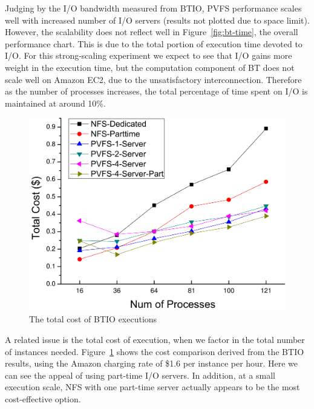     Judging by the I/O bandwidth measured from BTIO, PVFS performance scales
    well with increased number of I/O servers (results not plotted due
    to space limit). However, the scalability does not reflect well in
    Figure~\ref{fig:bt-time}, the overall performance chart. This is due to
    the total portion of execution time devoted to I/O. For this strong-scaling
    experiment we expect to see that I/O gains more weight in the execution
    time, but the computation component of BT does not scale well on Amazon
    EC2, due to the unsatisfactory interconnection. Therefore as the number of
    processes increases, the total percentage of time spent on I/O is
    maintained at around 10\%.
    \begin{figure}[htpb]
        \centering
        \includegraphics[width=0.8\linewidth]{../figures/T-cost}
        \caption{The total cost of BTIO executions}
        \label{fig:bt-cost}
    \end{figure}

    A related issue is the total cost of execution, when we factor in the
    total number of instances needed. Figure~\ref{fig:bt-cost} shows the cost
    comparison derived from the BTIO results, using the Amazon
    charging rate of \$1.6 per instance per hour. Here we can see the appeal
    of using part-time I/O servers. In addition, at a small execution scale,
    NFS with one part-time server actually appears to be the most
    cost-effective option.

